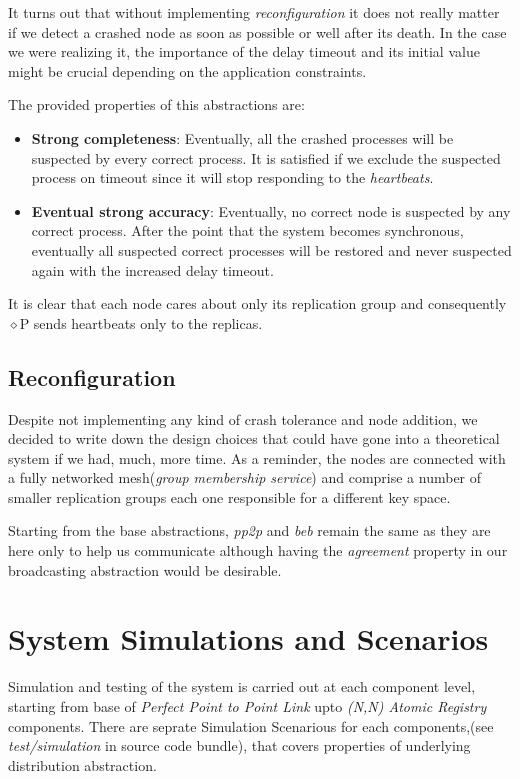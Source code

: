 \documentclass[a4paper, 11pt]{article}
\begin{document}
It turns out that without implementing \textit{reconfiguration} it does not really matter if we detect a crashed node as soon as possible or well after its death. In the case we were realizing it, the importance of the delay timeout and its initial value might be crucial depending on the application constraints.

The provided properties of this abstractions are:
\begin{itemize}
	\item \textbf{Strong completeness}: Eventually, all the crashed processes will be suspected by every correct process. It is satisfied if we exclude the suspected process on timeout since it will stop responding to the \textit{heartbeats}.
	\item \textbf{Eventual strong accuracy}: Eventually, no correct node is suspected by any correct process. After the point that the system becomes synchronous, eventually all suspected correct processes will be restored and never suspected again with the increased delay timeout.
\end{itemize}

It is clear that each node cares about only its replication group and consequently $\diamond$P sends heartbeats only to the replicas. 

\subsection{Reconfiguration}

Despite not implementing any kind of crash tolerance and node addition, we decided to write down the design choices that could have gone into a theoretical system if we had, much, more time. As a reminder, the nodes are connected with a fully networked mesh(\textit{group membership service}) and comprise a number of smaller replication groups each one responsible for a different key space. \par

Starting from the base abstractions, \textit{pp2p} and \textit{beb} remain the same as they are here only to help us communicate although having the \textit{agreement} property in our broadcasting abstraction would be desirable. 

\section{System Simulations and Scenarios}
Simulation and testing of the system is carried out at each component level, starting from base of \textit{Perfect Point to Point Link} upto \textit{(N,N) Atomic Registry} components.
There are seprate Simulation Scenarious for each components,(see \textit{test/simulation} in source code bundle), that covers properties of underlying distribution abstraction.
\end{document}
